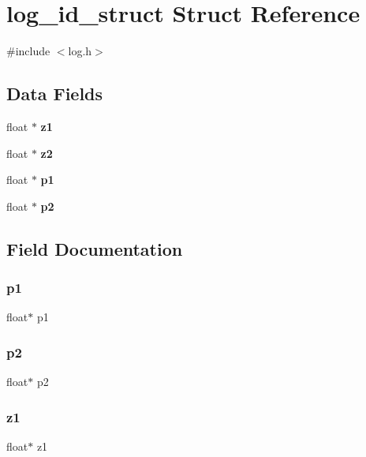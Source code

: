 \section{log\+\_\+id\+\_\+struct Struct Reference}
\label{structlog__id__struct}


{\ttfamily \#include $<$log.\+h$>$}

\subsection*{Data Fields}
\begin{DoxyCompactItemize}
\item 
float $\ast$ \textbf{ z1}
\item 
float $\ast$ \textbf{ z2}
\item 
float $\ast$ \textbf{ p1}
\item 
float $\ast$ \textbf{ p2}
\end{DoxyCompactItemize}


\subsection{Field Documentation}
\mbox{\label{structlog__id__struct_af77f31657a14d7b13caf94d56091d53d}} 
\subsubsection{p1}
{\footnotesize\ttfamily float$\ast$ p1}

\mbox{\label{structlog__id__struct_a9270f1891ad0557ce99106e66b18d0a4}} 
\subsubsection{p2}
{\footnotesize\ttfamily float$\ast$ p2}

\mbox{\label{structlog__id__struct_ac9ea6cb78ca7e52d475514fb29235b48}} 
\subsubsection{z1}
{\footnotesize\ttfamily float$\ast$ z1}

